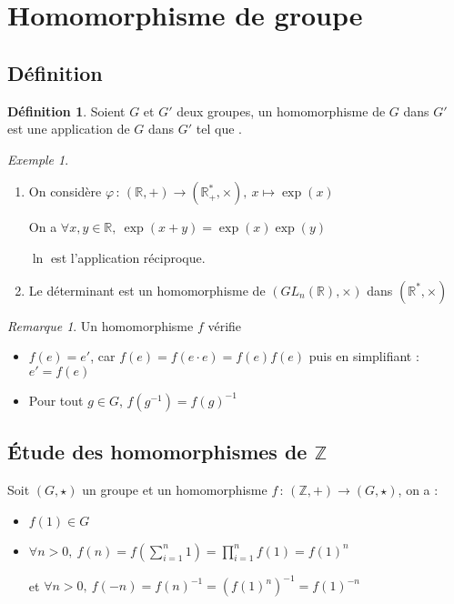 \documentclass[]{article}
\theoremstyle{remark}
\newtheorem{myrem}{Remarque}
\newtheorem{myexmpl}{Exemple}
\theoremstyle{definition}
\newtheorem{mydef}{Définition}
\newcommand{\funcinline}[5]{
#1 \, : \, #2 \longrightarrow #3, ~ #4 \longmapsto #5
}
\newcommand{\funcshort}[3]{
#1 \, : \, #2 \longrightarrow #3
}
\begin{document}
\section{Homomorphisme de groupe}

\subsection{Définition}

\begin{mydef}
	Soient $G$ et $G'$ deux groupes, un homomorphisme de $G$ dans $G'$ est une application de $G$ dans $G'$ tel que .
\end{mydef}

\begin{myexmpl}
	\leavevmode
	\begin{enumerate}
		\item On considère $\funcinline{\varphi}{(\mathbb{R}, +)}{(\mathbb{R}^*_+, \times)}{x}{\exp(x)}$
		
		On a $\forall x, y \in \mathbb{R}, ~ \exp(x+y)=\exp(x)\exp(y)$
		
		$\ln$ est l'application réciproque.
		
		\item Le déterminant est un homomorphisme de $(GL_n(\mathbb{R}), \times)$ dans $(\mathbb{R}^*, \times)$
	\end{enumerate}
\end{myexmpl}

\begin{myrem}
	Un homomorphisme $f$ vérifie 
	\begin{itemize}
		\item $f(e)=e'$, car $f(e)=f(e \cdot e)=f(e)f(e)$ puis en simplifiant : $e' = f(e)$
		\item Pour tout $g \in G$, $f(g^{-1})=f(g)^{-1}$
	\end{itemize}
\end{myrem}

\subsection{Étude des homomorphismes de $\mathbb{Z}$}

Soit $(G, \star)$ un groupe et un homomorphisme  $\funcshort{f}{(\mathbb{Z}, +)}{(G, \star)}$, on a :
\begin{itemize}
	\item $f(1) \in G$
	\item $\displaystyle \forall n > 0, ~ f(n) = f\left(\sum_{i=1}^{n} 1\right) = \prod_{i=1}^{n} f(1) = f(1)^n$
	
	et $\displaystyle \forall n > 0, ~ f(-n) = f(n)^{-1} = \left(f(1)^n\right)^{-1} = f(1)^{-n}$
\end{itemize}
\end{document}
